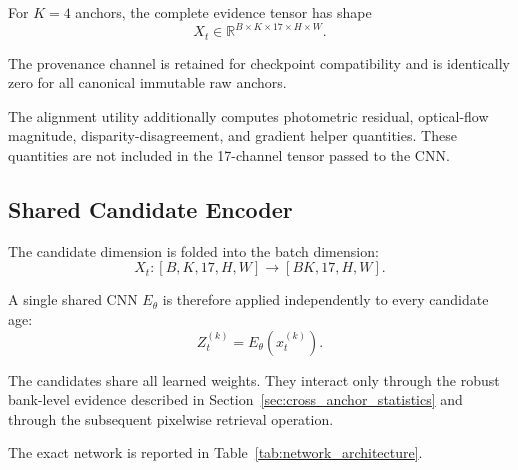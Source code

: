 \documentclass[11pt,a4paper]{article}
\begin{document}
For \(K=4\) anchors, the complete evidence tensor has shape
%
\begin{equation}
X_t
\in
\mathbb{R}^{B\times K\times17\times H\times W}.
\label{eq:complete_evidence_shape}
\end{equation}

The provenance channel is retained for checkpoint compatibility and is
identically zero for all canonical immutable raw anchors.

The alignment utility additionally computes photometric residual,
optical-flow magnitude, disparity-disagreement, and gradient helper
quantities. These quantities are not included in the 17-channel tensor
passed to the CNN.

\subsection{Shared Candidate Encoder}
\label{sec:shared_encoder}

The candidate dimension is folded into the batch dimension:
%
\begin{equation}
X_t:
[B,K,17,H,W]
\longrightarrow
[BK,17,H,W].
\end{equation}

A single shared CNN \(E_\theta\) is therefore applied independently to
every candidate age:
%
\begin{equation}
Z_t^{(k)}
=
E_\theta
\left(
x_t^{(k)}
\right).
\label{eq:shared_candidate_encoder}
\end{equation}

The candidates share all learned weights. They interact only through the
robust bank-level evidence described in
Section~\ref{sec:cross_anchor_statistics} and through the subsequent
pixelwise retrieval operation.

The exact network is reported in Table~\ref{tab:network_architecture}.

\begin{table}[t]
\centering
\caption{
Layer-by-layer architecture of the shared candidate encoder.
}
\label{tab:network_architecture}
\end{table}
\end{document}
